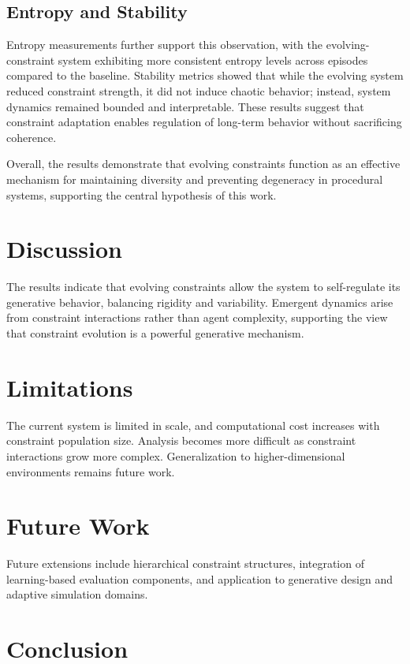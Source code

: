 \documentclass[11pt]{article}
\begin{document}
\subsection{Entropy and Stability}

Entropy measurements further support this observation, with the evolving-constraint system exhibiting more consistent entropy levels across episodes compared to the baseline. Stability metrics showed that while the evolving system reduced constraint strength, it did not induce chaotic behavior; instead, system dynamics remained bounded and interpretable. These results suggest that constraint adaptation enables regulation of long-term behavior without sacrificing coherence.

Overall, the results demonstrate that evolving constraints function as an effective mechanism for maintaining diversity and preventing degeneracy in procedural systems, supporting the central hypothesis of this work.



\section{Discussion}

The results indicate that evolving constraints allow the system to self-regulate its generative behavior, balancing rigidity and variability. Emergent dynamics arise from constraint interactions rather than agent complexity, supporting the view that constraint evolution is a powerful generative mechanism.

\section{Limitations}

The current system is limited in scale, and computational cost increases with constraint population size. Analysis becomes more difficult as constraint interactions grow more complex. Generalization to higher-dimensional environments remains future work.

\section{Future Work}

Future extensions include hierarchical constraint structures, integration of learning-based evaluation components, and application to generative design and adaptive simulation domains.

\section{Conclusion}
\end{document}

